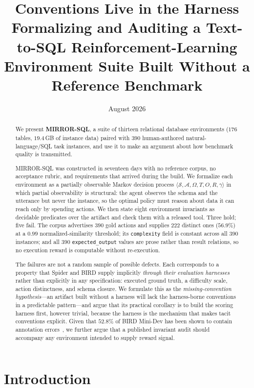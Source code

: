 \documentclass[11pt,letterpaper]{article}
\title{\textbf{Conventions Live in the Harness}\\[0.35em]
\large Formalizing and Auditing a Text-to-SQL Reinforcement-Learning\\
Environment Suite Built Without a Reference Benchmark}
\author{}
\date{August 2026}
\theoremstyle{definition}
\theoremstyle{plain}
\theoremstyle{remark}
\newcommand{\Aset}{\mathcal{A}}
\newcommand{\Sset}{\mathcal{S}}
\newcommand{\code}[1]{\texttt{#1}}
\begin{document}
\maketitle

\begin{abstract}
\noindent
We present \textbf{MIRROR-SQL}, a suite of thirteen relational database environments
($176$ tables, $19.4$\,GB of instance data) paired with $390$ human-authored
natural-language/SQL task instances, and use it to make an argument about how benchmark
quality is transmitted.

MIRROR-SQL was constructed in seventeen days with no reference corpus, no acceptance rubric, and
requirements that arrived during the build. We formalize each environment as a partially
observable Markov decision process $\langle \Sset, \Aset, \Omega, T, O, R, \gamma\rangle$ in
which partial observability is structural: the agent observes the schema and the utterance
but never the instance, so the optimal policy must reason about data it can reach only by
spending actions. We then state eight environment invariants as decidable predicates over the
artifact and check them with a released tool. Three hold; five fail. The corpus advertises $390$
gold actions and supplies $222$ distinct ones ($56.9\%$) at a $0.99$ normalized-similarity
threshold; its \code{complexity} field is constant across all $390$ instances; and all $390$
\code{expected\_output} values are prose rather than result relations, so no execution reward
is computable without re-execution.

The failures are not a random sample of possible defects. Each corresponds to a property that
Spider and BIRD supply implicitly \emph{through their evaluation harnesses} rather than
explicitly in any specification: executed ground truth, a difficulty scale, action
distinctness, and schema closure. We formulate this as the \emph{missing-convention
hypothesis}---an artifact built without a harness will lack the harness-borne conventions in
a predictable pattern---and argue that its practical corollary is to build the scoring
harness first, however trivial, because the harness is the mechanism that makes tacit
conventions explicit. Given that $52.8\%$ of BIRD Mini-Dev has been shown to contain
annotation errors~\cite{jin2026broken}, we further argue that a published invariant audit
should accompany any environment intended to supply reward signal.
\end{abstract}

\section{Introduction}
\label{sec:intro}
\end{document}
